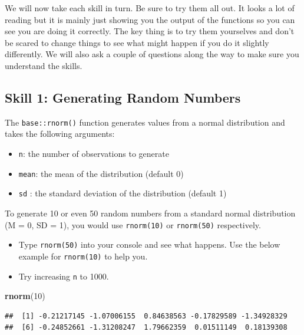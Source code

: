 \documentclass[]{book}
\newenvironment{Shaded}{\begin{snugshade}}{\end{snugshade}}
\newcommand{\DecValTok}[1]{\textcolor[rgb]{0.00,0.00,0.81}{#1}}
\newcommand{\KeywordTok}[1]{\textcolor[rgb]{0.13,0.29,0.53}{\textbf{#1}}}
\newcommand{\NormalTok}[1]{#1}
\providecommand{\tightlist}{%
  \setlength{\itemsep}{0pt}\setlength{\parskip}{0pt}}
\begin{document}
We will now take each skill in turn. Be sure to try them all out. It looks a lot of reading but it is mainly just showing you the output of the functions so you can see you are doing it correctly. The key thing is to try them yourselves and don't be scared to change things to see what might happen if you do it slightly differently. We will also ask a couple of questions along the way to make sure you understand the skills.

\hypertarget{skill-1-generating-random-numbers}{%
\subsection{Skill 1: Generating Random Numbers}\label{skill-1-generating-random-numbers}}

The \texttt{base::rnorm()} function generates values from a normal distribution and takes the following arguments:

\begin{itemize}
\tightlist
\item
  \texttt{n}: the number of observations to generate
\item
  \texttt{mean}: the mean of the distribution (default 0)
\item
  \texttt{sd} : the standard deviation of the distribution (default 1)
\end{itemize}

To generate 10 or even 50 random numbers from a standard normal distribution (M = 0, SD = 1), you would use \texttt{rnorm(10)} or \texttt{rnorm(50)} respectively.

\begin{itemize}
\tightlist
\item
  Type \texttt{rnorm(50)} into your console and see what happens. Use the below example for \texttt{rnorm(10)} to help you.\\
\item
  Try increasing \texttt{n} to 1000.
\end{itemize}

\begin{Shaded}
\begin{Highlighting}[]
\KeywordTok{rnorm}\NormalTok{(}\DecValTok{10}\NormalTok{)}
\end{Highlighting}
\end{Shaded}

\begin{verbatim}
##  [1] -0.21217145 -1.07006155  0.84638563 -0.17829589 -1.34928329
##  [6] -0.24852661 -1.31208247  1.79662359  0.01511149  0.18139308
\end{verbatim}
\end{document}
